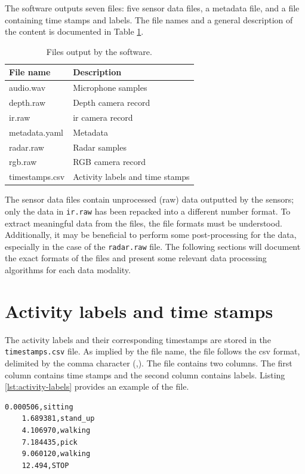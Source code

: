 The software outputs seven files: five sensor data files, a metadata file, and a file containing time stamps and labels.
The file names and a general description of the content is documented in Table \ref{tab:3-files}.

\begin{table}[H]
    \centering
    \begin{tabular}{l l}
    \toprule
    \textbf{File name} & \textbf{Description} \\
    \midrule
    audio.wav & Microphone samples \\
    depth.raw & Depth camera record \\
    ir.raw & \gls{ir} camera record \\
    metadata.yaml & Metadata \\
    radar.raw & Radar samples \\
    rgb.raw & RGB camera record \\
    timestamps.csv & Activity labels and time stamps \\
    \bottomrule
    \end{tabular}
    \caption{Files output by the software.}
    \label{tab:3-files}
\end{table}

The sensor data files contain unprocessed (raw) data outputted by the sensors;
only the data in \texttt{ir.raw} has been repacked into a different number format.
To extract meaningful data from the files, the file formats must be understood.
Additionally, it may be beneficial to perform some post-processing for the data,
especially in the case of the \texttt{radar.raw} file.
The following sections will document the exact formats of the files
and present some relevant data processing algorithms for each data modality.

\section{Activity labels and time stamps}
The activity labels and their corresponding timestamps are stored in the \texttt{timestamps.csv} file.
As implied by the file name, the file follows the \gls{csv} format, delimited by the comma character (,).
The file contains two columns.
The first column contains time stamps and the second column contains labels.
Listing \ref{lst:activity-labels} provides an example of the file.

\newpage
\begin{lstlisting}[caption={Example \texttt{timestamps.csv} file.},label={lst:activity-labels}]
    0.000506,sitting
    1.689381,stand_up
    4.106970,walking
    7.184435,pick
    9.060120,walking
    12.494,STOP
\end{lstlisting}


